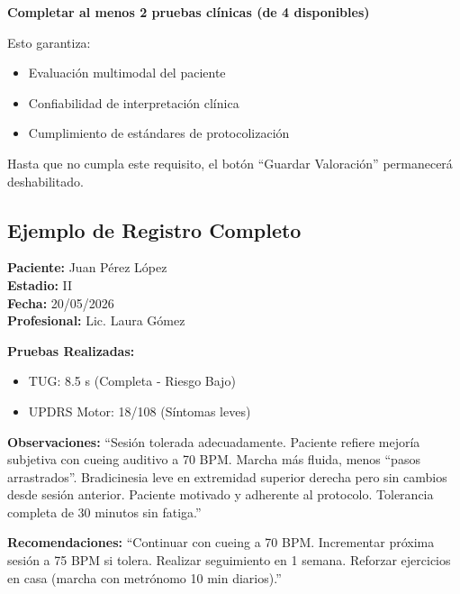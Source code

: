 \documentclass[12pt,a4paper,spanish,oneside]{book}
\begin{document}
\begin{advertenciabox}
  \textbf{Completar al menos 2 pruebas clínicas (de 4 disponibles)}
  
  Esto garantiza:
  \begin{itemize}
    \item Evaluación multimodal del paciente
    \item Confiabilidad de interpretación clínica
    \item Cumplimiento de estándares de protocolización
  \end{itemize}
  
  Hasta que no cumpla este requisito, el botón ``Guardar Valoración'' permanecerá deshabilitado.
\end{advertenciabox}

\subsection{Ejemplo de Registro Completo}

\begin{ejemplobox}
  \textbf{Paciente:} Juan Pérez López \\
  \textbf{Estadio:} II \\
  \textbf{Fecha:} 20/05/2026 \\
  \textbf{Profesional:} Lic. Laura Gómez
  
  \vspace{0.3cm}
  
  \textbf{Pruebas Realizadas:}
  \begin{itemize}
    \item TUG: 8.5 s (Completa - Riesgo Bajo)
    \item UPDRS Motor: 18/108 (Síntomas leves)
  \end{itemize}
  
  \textbf{Observaciones:}
  ``Sesión tolerada adecuadamente. Paciente refiere mejoría subjetiva con cueing auditivo a 70 BPM. Marcha más fluida, menos ``pasos arrastrados''. Bradicinesia leve en extremidad superior derecha pero sin cambios desde sesión anterior. Paciente motivado y adherente al protocolo. Tolerancia completa de 30 minutos sin fatiga.''
  
  \textbf{Recomendaciones:}
  ``Continuar con cueing a 70 BPM. Incrementar próxima sesión a 75 BPM si tolera. Realizar seguimiento en 1 semana. Reforzar ejercicios en casa (marcha con metrónomo 10 min diarios).''
\end{ejemplobox}

\end{document}

